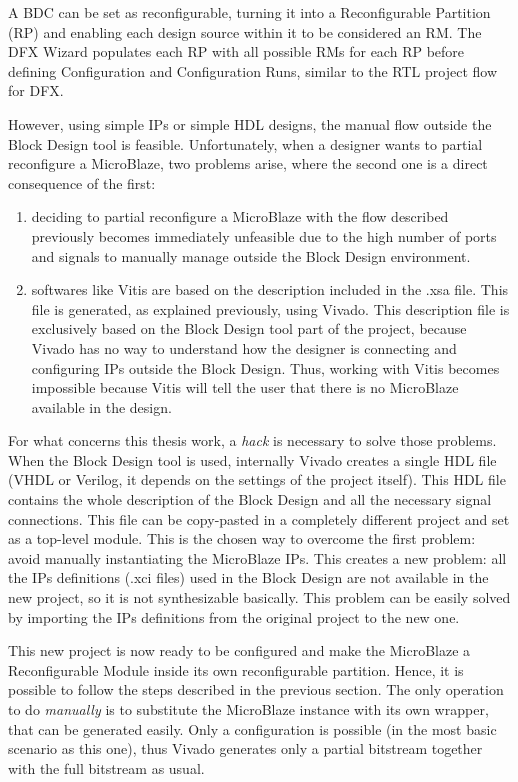A BDC can be set as reconfigurable, turning it into a Reconfigurable Partition (RP) and enabling each design source within it to be considered an RM. The DFX Wizard populates each RP with all possible RMs for each RP before defining Configuration and Configuration Runs, similar to the RTL project flow for DFX. \bigskip

However, using simple IPs or simple HDL designs, the manual flow outside the Block Design tool is feasible. Unfortunately, when a designer wants to partial reconfigure a MicroBlaze, two problems arise, where the second one is a direct consequence of the first:

\begin{enumerate}
    \item deciding to partial reconfigure a MicroBlaze with the flow described previously becomes immediately unfeasible due to the high number of ports and signals to manually manage outside the Block Design environment. 
    \item softwares like Vitis are based on the description included in the .xsa file. This file is generated, as explained previously, using Vivado. This description file is exclusively based on the Block Design tool part of the project, because Vivado has no way to understand how the designer is connecting and configuring IPs outside the Block Design. Thus, working with Vitis becomes impossible because Vitis will tell the user that there is no MicroBlaze available in the design. 
\end{enumerate}

For what concerns this thesis work, a \textit{hack} is necessary to solve those problems. When the Block Design tool is used, internally Vivado creates a single HDL file (VHDL or Verilog, it depends on the settings of the project itself). This HDL file contains the whole description of the Block Design and all the necessary signal connections. This file can be copy-pasted in a completely different project and set as a top-level module. This is the chosen way to overcome the first problem: avoid manually instantiating the MicroBlaze IPs. This creates a new problem: all the IPs definitions (.xci files) used in the Block Design are not available in the new project, so it is not synthesizable basically. This problem can be easily solved by importing the IPs definitions from the original project to the new one. \bigskip

This new project is now ready to be configured and make the MicroBlaze a Reconfigurable Module inside its own reconfigurable partition. Hence, it is possible to follow the steps described in the previous section. The only operation to do \textit{manually} is to substitute the MicroBlaze instance with its own wrapper, that can be generated easily. Only a configuration is possible (in the most basic scenario as this one), thus Vivado generates only a partial bitstream together with the full bitstream as usual.\bigskip

